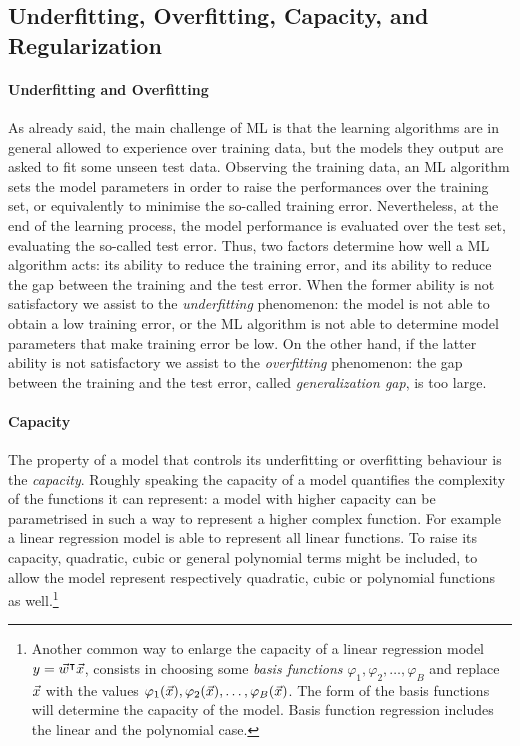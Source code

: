 \subsection{Underfitting, Overfitting, Capacity,  and Regularization}\label{sec:overfitting}
\paragraph*{Underfitting and Overfitting} As already said, the main challenge of ML is that the learning algorithms are in general allowed to experience over training data, but the models they output are asked to fit some unseen test data. Observing the training data, an ML algorithm sets the model parameters in order to raise the performances over the training set, or equivalently to minimise the so-called training error. Nevertheless, at the end of the learning process, the model performance is evaluated over the test set, evaluating the so-called test error. Thus, two factors determine how well a ML algorithm acts: its ability to reduce the training error, and its ability to reduce the gap between the training and the test error. When the former ability is not satisfactory we assist to the \emph{underfitting} phenomenon: the model is not able to obtain a low training error, or the ML algorithm is not able to determine model parameters that make training error be low. On the other hand, if the latter ability is not satisfactory we assist to the \emph{overfitting} phenomenon: the gap between the training and the test error, called \emph{generalization gap}, is too large. \\

\paragraph*{Capacity}The property of a model that controls its underfitting or overfitting behaviour is the \emph{capacity}. Roughly speaking the capacity of a model quantifies the complexity of the functions it can represent: a model with higher capacity can be parametrised in such a way to represent a higher complex function. For example a linear regression model is able to represent all linear functions. To raise its capacity, quadratic, cubic or general polynomial terms might be included, to allow the model represent respectively quadratic, cubic or polynomial functions as well.\footnote{Another common way to enlarge the capacity of a linear regression model $y = \vec{w}^\intercal \vec{x}$,  consists in choosing some \emph{basis functions} $\varphi_1, \varphi_2,\dots, \varphi_B$ and replace $\vec{x}$ with the values $\varphi_1(\vec{x}), \varphi_2(\vec{x}),\dots, \varphi_B(\vec{x})$. The form of the basis functions will determine the capacity of the model. Basis function regression includes the linear and the polynomial case.} \\

